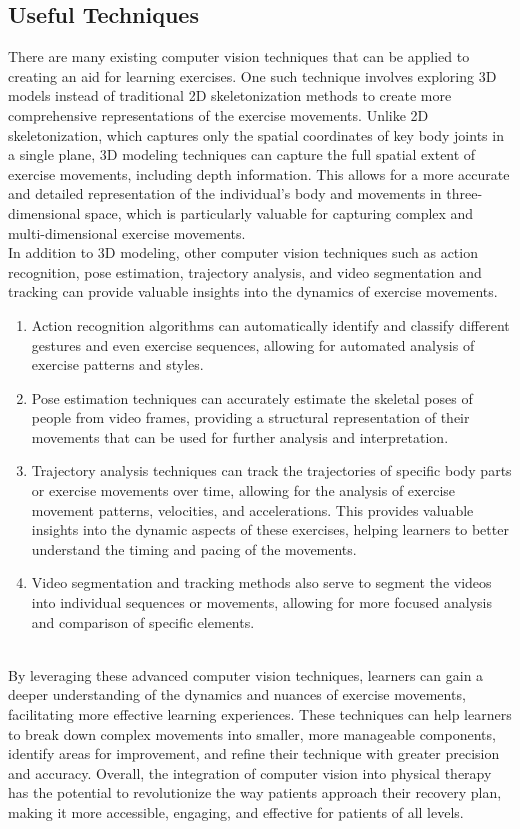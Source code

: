 \subsection{Useful Techniques}
\indent There are many existing computer vision techniques that can be applied to creating an aid for learning exercises. 
One such technique involves exploring 3D models instead of traditional 2D skeletonization
 methods to create more comprehensive representations of the exercise movements. Unlike 2D skeletonization, 
 which captures only the spatial coordinates of key body joints in a single plane, 3D modeling 
 techniques can capture the full spatial extent of exercise movements, including depth information\cite{Alpher03}. This 
 allows for a more accurate and detailed representation of the individual's body and movements in 
 three-dimensional space, which is particularly valuable for capturing complex and multi-dimensional 
 exercise movements\cite{Authors14b}.
\\
\indent In addition to 3D modeling, other computer vision techniques such as action recognition, pose 
estimation, trajectory analysis, and video segmentation and tracking can provide valuable insights 
into the dynamics of exercise movements.
\begin{enumerate}
  \item Action recognition algorithms can automatically identify and classify different gestures and 
  even exercise sequences, allowing for automated analysis of exercise patterns and styles.
  \item Pose estimation techniques can accurately estimate the skeletal poses of 
  people from video frames, providing a structural representation of their movements that can be 
  used for further analysis and interpretation.
  \item Trajectory analysis techniques can track the trajectories of specific body parts or exercise movements 
  over time, allowing for the analysis of exercise movement patterns, velocities, and accelerations\cite{Alpher02}. This 
  provides valuable insights into the dynamic aspects of these exercises, 
  helping learners to better understand the timing and pacing of the movements.
  \item Video segmentation and tracking methods also serve to segment the videos into individual sequences or movements, allowing for more 
  focused analysis and comparison of specific elements.
\end{enumerate} 
\\
\indent By leveraging these advanced computer vision techniques, learners can gain a deeper understanding 
of the dynamics and nuances of exercise movements, facilitating more effective learning experiences. 
These techniques can help learners to break down complex movements into smaller, more 
manageable components, identify areas for improvement, and refine their technique with greater 
precision and accuracy. Overall, the integration of computer vision into physical therapy has the 
potential to revolutionize the way patients approach their recovery plan, making it more accessible, engaging, 
and effective for patients of all levels.

